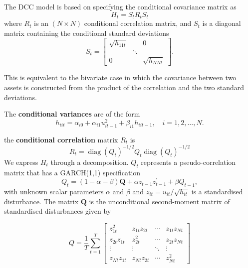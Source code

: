 \documentclass[11pt]{article}
\begin{document}
\begin{definition}
The DCC model is based on specifying the conditional covariance matrix as
\begin{equation}
    \label{DCC spec}
    H_t = S_t R_t S_t
\end{equation}
where $R_t$ is an $(N\times N)$ conditional correlation matrix, and $S_t$ is a diagonal matrix containing the conditional standard deviations
\begin{equation}
S_t=\left[\begin{array}{ccc}
\sqrt{h_{11 t}} & & 0 \\
& \ddots & \\
0 & & \sqrt{h_{N N t}}
\end{array}\right].
\end{equation}

\begin{note}
This is equivalent to the bivariate case in which the covariance between two assets is constructed from the product of the correlation and the two standard deviations.    
\end{note}

The \textbf{conditional variances} are of the form
\[h_{iit} = \alpha_{i0} + \alpha_{i1} u_{it-1}^2 + \beta _{i1} h_{iit-1}, \quad i =1,2,\ldots, N.\]

the \textbf{conditional correlation} matrix $R_t$ is
\begin{equation}
R_t=\operatorname{diag}\left(Q_t\right)^{-1 / 2} Q_t \operatorname{diag}\left(Q_t\right)^{-1 / 2}
\end{equation}
We express $H_t$ through a decomposition. $Q_t$ represents a pseudo-correlation matrix that has a GARCH(1,1) specification
\[Q_t = (1-\alpha-\beta) \boldsymbol{Q} + \alpha z_{t-1}z_{t-1}^\prime + \beta Q_{t-1},\]
with unknown scalar parameters $\alpha$ and $\beta$ and $z_{it} = u_{it}/\sqrt{h_{it}}$ is a standardised disturbance. The matrix $\boldsymbol{Q}$ is the unconditional second-moment matrix of standardised disturbances given by

\begin{equation}
Q=\frac{1}{T} \sum_{t=1}^T\left[\begin{array}{cccc}
z_{1 t}^2 & z_{1 t} z_{2 t} & \cdots & z_{1 t} z_{N t} \\
z_{2 t} z_{1 t} & z_{2 t}^2 & \cdots & z_{2 t} z_{N t} \\
\vdots & \vdots & \ddots & \vdots \\
z_{N t} z_{1 t} & z_{N t} z_{2 t} & \cdots & z_{N t}^2
\end{array}\right]
\end{equation}

\end{definition}
\end{document}
